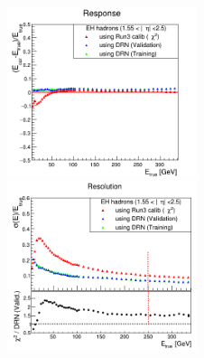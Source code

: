 \begin{figure}
\includegraphics[width=0.495\textwidth]{./plots_pdf/HCAL_plots/Trained_target_ratioflip_0_500_10/pdf/EH_ec_in/EC_within_tracker_corrEtaEndcapEcalHcal.png}
\includegraphics[width=0.495\textwidth]{./plots_pdf/HCAL_plots/Trained_target_ratioflip_0_500_10/pdf/EH_ec_in/EC_within_tracker_corrEtaEndcapEcalHcal_reso.png}



\end{figure}
